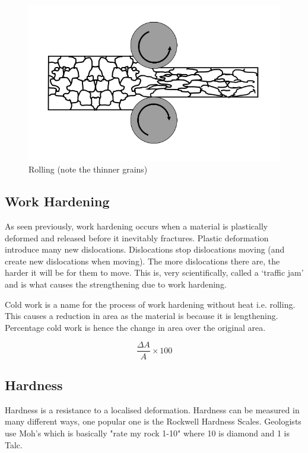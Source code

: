 \documentclass[12pt]{article}
\begin{document}
\begin{center}
\begin{figure}[h]
  \includegraphics[scale=0.5]{rolling}

  \caption{Rolling (note the thinner grains)}
\end{figure}
\end{center}

\subsection{Work Hardening} 
As seen previously, work hardening occurs when a material is plastically deformed and released before it inevitably fractures.
Plastic deformation introduce many new dislocations.
Dislocations stop dislocations moving (and create new dislocations when moving).
The more dislocations there are, the harder it will be for them to move. 
This is, very scientifically, called a `traffic jam' and is what causes the strengthening due to work hardening.

\vspace{1cm}
Cold work is a name for the process of work hardening without heat i.e. rolling.
This causes a reduction in area as the material is because it is lengthening. 
Percentage cold work is hence the change in area over the original area. 

\begin{equation*}
  \frac{\Delta A}{A} \times 100
\end{equation*}

\subsection{Hardness}
Hardness is a resistance to a localised deformation. 
Hardness can be measured in many different ways, one popular one is the Rockwell Hardness Scales.
Geologists use Moh's which is basically "rate my rock 1-10" where 10 is diamond and 1 is Talc.
\end{document}

